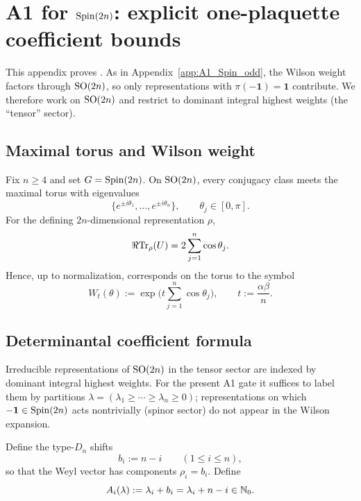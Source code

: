 \section{A1 for \texorpdfstring{$\mathrm{Spin}(2n)$}{Spin(2n)}: explicit one-plaquette coefficient bounds}
\label{app:A1_Spin_even}

This appendix proves .
As in Appendix~\ref{app:A1_Spin_odd}, the Wilson weight factors through $\mathrm{SO}(2n)$,
so only representations with $\pi(-\mathbf 1)=\mathbf 1$ contribute.
We therefore work on $\mathrm{SO}(2n)$ and restrict to dominant integral highest weights (the ``tensor'' sector).

\subsection{Maximal torus and Wilson weight}
\label{subsec:A1_Spin_even_setup}

Fix $n\ge 4$ and set $G=\mathrm{Spin}(2n)$.
On $\mathrm{SO}(2n)$, every conjugacy class meets the maximal torus with eigenvalues
\begin{equation}
\label{eq:SO_even_eigs}
\{e^{\pm i\theta_1},\dots,e^{\pm i\theta_n}\},\qquad \theta_j\in[0,\pi].
\end{equation}
For the defining $2n$-dimensional representation $\rho$,
\begin{equation}
\label{eq:SO_even_trace}
\Re\mathrm{Tr}_{\rho}(U)=2\sum_{j=1}^n \cos\theta_j.
\end{equation}
Hence, up to normalization,
 corresponds on the torus to the symbol
\begin{equation}
\label{eq:SO_even_symbol}
W_t(\theta):=\exp\Big(t\sum_{j=1}^n \cos\theta_j\Big),
\qquad t:=\frac{\alpha\beta}{n}.
\end{equation}

\subsection{Determinantal coefficient formula}
\label{subsec:A1_Spin_even_determinant}

Irreducible representations of $\mathrm{SO}(2n)$ in the tensor sector are indexed by dominant integral highest weights.
For the present A1 gate it suffices to label them by partitions $\lambda=(\lambda_1\ge\cdots\ge\lambda_n\ge 0)$;
representations on which $-\mathbf 1\in\mathrm{Spin}(2n)$ acts nontrivially (spinor sector) do not appear in the Wilson expansion.

Define the type-$D_n$ shifts
\begin{equation}
\label{eq:SO_even_bi}
 b_i:=n-i\qquad(1\le i\le n),
\end{equation}
so that the Weyl vector has components $\rho_i=b_i$.
Define
\begin{equation}
\label{eq:SO_even_Ai}
A_i(\lambda):=\lambda_i+b_i=\lambda_i+n-i\in\mathbb N_0.
\end{equation}

